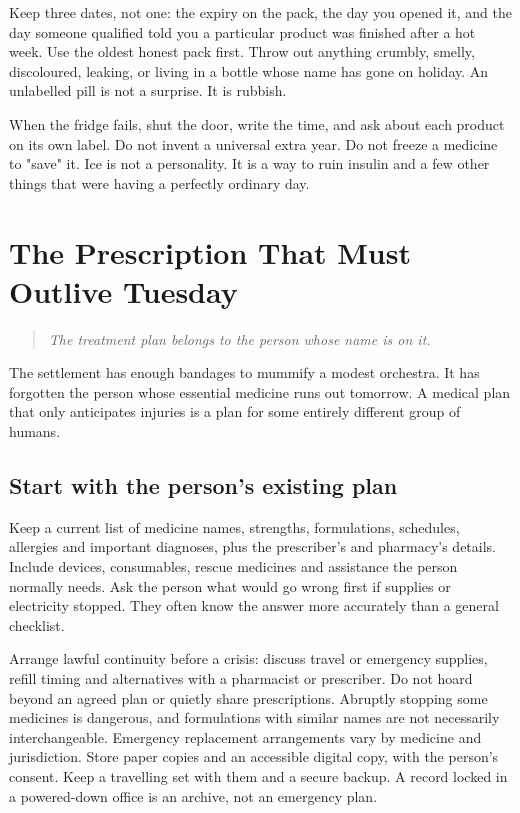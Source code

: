 \documentclass[10pt,openright]{book}
\begin{document}
Keep three dates, not one: the expiry on the pack, the day you opened it, and the day someone qualified told you a particular product was finished after a hot week. Use the oldest honest pack first. Throw out anything crumbly, smelly, discoloured, leaking, or living in a bottle whose name has gone on holiday. An unlabelled pill is not a surprise. It is rubbish.

When the fridge fails, shut the door, write the time, and ask about each product on its own label. Do not invent a universal extra year. Do not freeze a medicine to "save" it. Ice is not a personality. It is a way to ruin insulin and a few other things that were having a perfectly ordinary day.

\chapter{The Prescription That Must Outlive Tuesday}
\begin{quote}\emph{The treatment plan belongs to the person whose name is on it.}\end{quote}
The settlement has enough bandages to mummify a modest orchestra. It has forgotten the person whose essential medicine runs out tomorrow. A medical plan that only anticipates injuries is a plan for some entirely different group of humans.

\section*{Start with the person's existing plan}
Keep a current list of medicine names, strengths, formulations, schedules, allergies and important diagnoses, plus the prescriber's and pharmacy's details. Include devices, consumables, rescue medicines and assistance the person normally needs. Ask the person what would go wrong first if supplies or electricity stopped. They often know the answer more accurately than a general checklist.

Arrange lawful continuity before a crisis: discuss travel or emergency supplies, refill timing and alternatives with a pharmacist or prescriber. Do not hoard beyond an agreed plan or quietly share prescriptions. Abruptly stopping some medicines is dangerous, and formulations with similar names are not necessarily interchangeable. Emergency replacement arrangements vary by medicine and jurisdiction. Store paper copies and an accessible digital copy, with the person's consent. Keep a travelling set with them and a secure backup. A record locked in a powered-down office is an archive, not an emergency plan.
\end{document}

